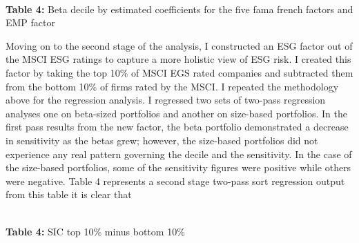 \begin{center}
    \paperspacingnarrow
    \\
    \textbf{Table 4:} Beta decile by estimated coefficients for the  five fama french factors and EMP factor\\
    \paperspacingwide
\end{center}

Moving on to the second stage of the analysis, I constructed an ESG factor out of the MSCI ESG ratings to capture a more holistic view of ESG risk. I created this factor by taking the top 10\% of MSCI EGS rated companies and subtracted them from the bottom 10\% of firms rated by the MSCI. I repeated the methodology above for the regression analysis. I  regressed two sets of two-pass regression analyses one on beta-sized portfolios and another on size-based portfolios. In the first pass results from the new factor, the beta portfolio demonstrated a decrease in sensitivity as the betas grew; however, the size-based portfolios did not experience any real pattern governing the decile and the sensitivity. In the case of the size-based portfolios, some of the sensitivity figures were positive while others were negative. Table 4 represents a second stage two-pass sort regression output from this table it is clear that 



\begin{center}
    \paperspacingnarrow
\\
\textbf{Table 4:} SIC top 10\% minus bottom 10\%
    \paperspacingwide
\end{center}